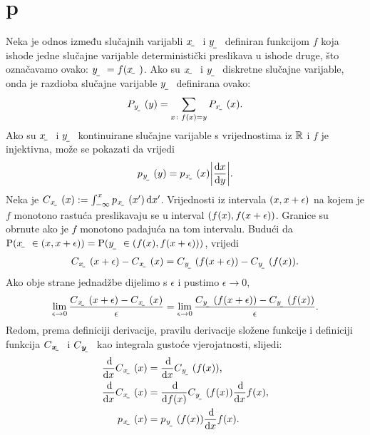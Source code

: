 \documentclass[twocolumn]{article}
\begin{document}
\section{p}

Neka je odnos između slučajnih varijabli $\rvar x$ i $\rvar y$ definiran funkcijom $f$ koja ishode jedne slučajne varijable deterministički preslikava u ishode druge, što označavamo ovako: $\rvar y = f(\rvar x)$.  Ako su $\rvar x$ i $\rvar y$ diskretne slučajne varijable, onda je razdioba slučajne varijable $\rvar y$ definirana ovako:
\begin{align}
	P_{\rvar y}(y) = \sum_{x\colon f(x)=y} P_\rvar{x}(x) \text{.}
\end{align} 
Ako su $\rvar x$ i $\rvar y$ kontinuirane slučajne varijable s vrijednostima iz $\mathbb{R}$ i $f$ je injektivna, može se pokazati \citep{Elezovic:2007:VSSV} da vrijedi
\begin{align} \label{eq:gustoca-funkcije-sv}
p_{\rvar y}(y) = p_\rvar{x}(x) \envert{\od{x}{y}} \text{.}
\end{align} 
Neka je $C_{\rvar x}(x) := \int_{-\infty}^{x} p_{\rvar x}(x') \dif{x'}$. Vrijednosti iz intervala $\intoo{x, x+\epsilon}$ na kojem je $f$ monotono rastuća preslikavaju se u interval $\intoo{f(x), f(x+\epsilon)}$. Granice su obrnute ako je $f$ monotono padajuća na tom intervalu. Budući da $\P\del{\rvar x\in\intoo{x, x+\epsilon}}=\P\del{\rvar y\in\intoo{f(x), f(x+\epsilon)}}$, vrijedi
\begin{align}
C_{\rvar x}(x+\epsilon)-C_{\rvar x}(x) = 
C_{\rvar y}(f(x+\epsilon))-C_{\rvar y}(f(x)) \text{.}
\end{align}
Ako obje strane jednadžbe dijelimo s $\epsilon$ i pustimo $\epsilon\to0$, 
\begin{align}
	\lim_{\epsilon\to 0}\frac{C_{\rvar x}(x+\epsilon)-C_{\rvar x}(x)}{\epsilon} = \lim_{\epsilon\to 0}\frac{C_{\rvar y}(f(x+\epsilon))-C_{\rvar y}(f(x))}{\epsilon} \text{.}
\end{align}
Redom, prema definiciji derivacije, pravilu derivacije složene funkcije i definiciji funkcija $C_\rvec{x}$ i $C_\rvec{y}$ kao integrala gustoće vjerojatnosti, slijedi:
\begin{align}
\od{}{x}C_{\rvar x}(x) &= \od{}{x}C_{\rvar y}(f(x)) \text{,}\\
\od{}{x}C_{\rvar x}(x) &= \od{}{f(x)}C_{\rvar y}(f(x))\od{}{x}f(x) \text{,}\\
p_{\rvar x}(x) &= p_{\rvar y}(f(x))\od{}{x}f(x) \text{.} \label{eq:gustoca-funkcije-sv-dokaz-rastuci}
\end{align}
\end{document}
